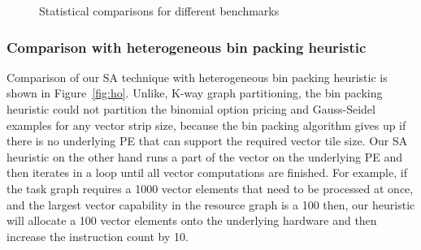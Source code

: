 \begin{figure}[t!]
{    %
  }
  \caption{Statistical comparisons for different benchmarks}
  \label{fig:8}
\end{figure}



\subsubsection{Comparison with heterogeneous bin packing heuristic}
\label{sec:comp-with-heter}

Comparison of our SA technique with heterogeneous bin packing heuristic
is shown in Figure~\ref{fig:ho}. Unlike, K-way graph partitioning, the
bin packing heuristic could not partition the binomial option pricing
and Gauss-Seidel examples for any vector strip size, because the bin
packing algorithm gives up if there is no underlying PE that can support
the required vector tile size. Our SA heuristic on the other hand runs a
part of the vector on the underlying PE and then iterates in a loop
until all vector computations are finished. For example, if the task
graph requires a 1000 vector elements that need to be processed at once,
and the largest vector capability in the resource graph is a 100 then,
our heuristic will allocate a 100 vector elements onto the underlying
hardware and then increase the instruction count by 10.

